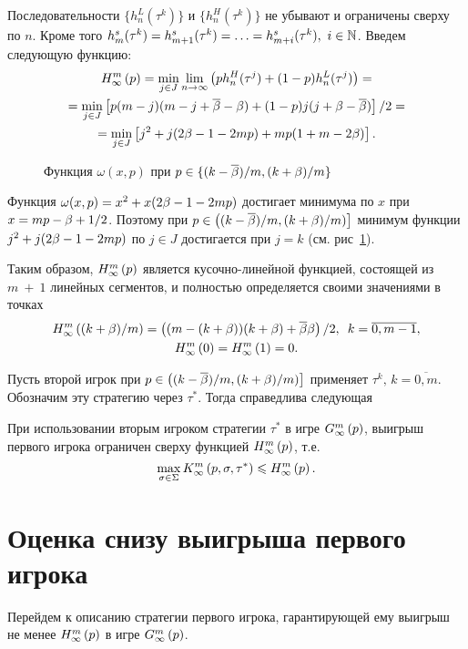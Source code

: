 {Последовательности $\{h_n^L(\tau^k)\}$ и $\{h_n^H(\tau^k)\}$ не убывают и
ограничены сверху по $n$. Кроме того %
$h^s_m(\tau^k) = h^s_{m+1}(\tau^k) = \ldots = h^s_{m+i}(\tau^k),\ i \in \mathbb{N}$.
Введем следующую функцию:
\begin{multline*}
  H_{\infty}^m\left({p}\right) 
  = \min_{j \in J} \lim_{n \rightarrow \infty}\left(
    ph_n^H(\tau^j) + (1-p)h_n^L(\tau^j)
  \right) = \\
  = \min_{j \in J} \left[ p (m - j)(m - j + \overline{\beta} - \beta) + (1 - p)j(j + \beta
    - \overline{\beta}) \right] / 2 = \\
  = \min_{j \in J} \left[ j^2 + j(2\beta - 1 - 2 m p) + m p (1 + m - 2\beta) \right].
\end{multline*}

\begin{figure}[b]
  \centering
  
  \caption{Функция $\omega(x,p)$ при $p \in \{(k-\overline{\beta})/m, (k+\beta)/m\}$}
  \label{ch1:fig:omega(x,p)}
\end{figure}

Функция $\omega(x, p) = x^2 + x(2\beta - 1 - 2mp)$ достигает минимума по $x$ при
$x = m p - \beta + 1/2$. Поэтому при $p \in \left( (k-\overline{\beta})/m, (k+\beta)/m) \right]$
минимум функции $j^2 + j(2\beta - 1 - 2 m p)$ по $j \in J$ достигается при $j = k$
(см. рис~\ref{ch1:fig:omega(x,p)}).

Таким образом, $H_{\infty}^m\left({p}\right)$ является кусочно-линейной функцией, состоящей из
$m~+~1$ линейных сегментов, и полностью определяется своими значениями в точках
\begin{gather*}
  H_{\infty}^m\left({(k+\beta)/m}\right) = \left( (m - (k + \beta))(k + \beta) + \overline{\beta}\beta
  \right) / 2, \enskip
  k = \overline{0, m - 1},\\
  H_{\infty}^m\left({0}\right) = H_{\infty}^m\left({1}\right) = 0.
\end{gather*}

Пусть второй игрок при $p \in \left( (k-\overline{\beta})/m, (k+\beta)/m) \right]$
применяет $\tau^k, \, k = \overline{0, m}$. Обозначим эту стратегию через
$\tau^*$. Тогда справедлива следующая
\begin{lemma}
  \label{ch1:lemma:upperBound}
  При использовании вторым игроком стратегии $\tau^*$ в игре
  $G_{\infty}^m\left({p}\right)$\textup{,} выигрыш первого игрока ограничен сверху функцией
  $H_{\infty}^m\left({p}\right)$, т.е.
  \[
    \max_{\sigma \in \Sigma} K_{\infty}^m\left({p}, {\sigma}, {\tau^*}\right) \leqslant
    H_{\infty}^m\left({p}\right).
  \]
\end{lemma}

\section{Оценка снизу выигрыша первого игрока}\label{ch1:lower-bound}
Перейдем к описанию стратегии первого игрока, гарантирующей ему выигрыш не менее
$H_{\infty}^m\left({p}\right)$ в игре $G_{\infty}^m\left({p}\right)$.

}
